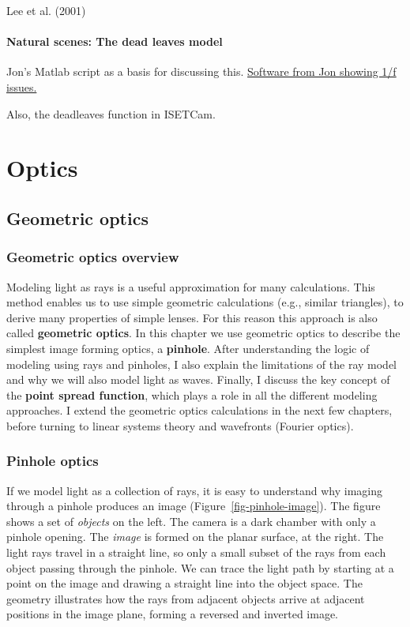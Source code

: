 \documentclass[
  letterpaper,
]{book}
\begin{document}
Lee et al. (2001)

\subsection{Natural scenes: The dead leaves
model}\label{natural-scenes-the-dead-leaves-model}

Jon's Matlab script as a basis for discussing this.
\href{https://github.com/isetbio/isetbio/blob/main/scripts/oneoverf/s_oneOverF1D.m}{Software
from Jon showing 1/f issues.}

Also, the deadleaves function in ISETCam.

\part{Optics}

\chapter{Geometric optics}\label{sec-geometric-optics}

\section{Geometric optics overview}\label{geometric-optics-overview}

Modeling light as rays is a useful approximation for many calculations.
This method enables us to use simple geometric calculations (e.g.,
similar triangles), to derive many properties of simple lenses. For this
reason this approach is also called \textbf{geometric optics}. In this
chapter we use geometric optics to describe the simplest image forming
optics, a \textbf{pinhole}. After understanding the logic of modeling
using rays and pinholes, I also explain the limitations of the ray model
and why we will also model light as waves. Finally, I discuss the key
concept of the \textbf{point spread function}, which plays a role in all
the different modeling approaches. I extend the geometric optics
calculations in the next few chapters, before turning to linear systems
theory and wavefronts (Fourier optics).

\section{Pinhole optics}\label{pinhole-optics}

If we model light as a collection of rays, it is easy to understand why
imaging through a pinhole produces an image
(Figure~\ref{fig-pinhole-image}). The figure shows a set of
\emph{objects} on the left. The camera is a dark chamber with only a
pinhole opening. The \emph{image} is formed on the planar surface, at
the right. The light rays travel in a straight line, so only a small
subset of the rays from each object passing through the pinhole. We can
trace the light path by starting at a point on the image and drawing a
straight line into the object space. The geometry illustrates how the
rays from adjacent objects arrive at adjacent positions in the image
plane, forming a reversed and inverted image.
\end{document}

